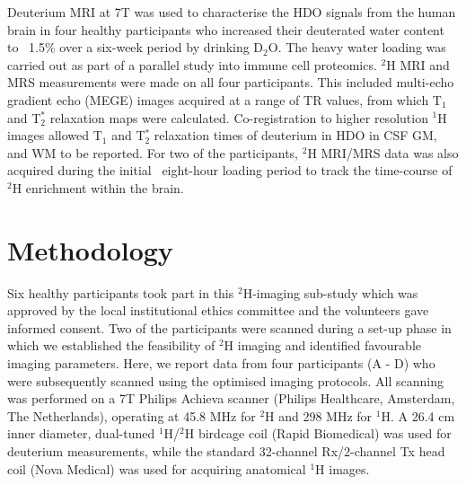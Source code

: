 \documentclass[class=article, crop=false]{standalone}
\begin{document}
Deuterium MRI at 7T was used to characterise the HDO signals from the human brain in four healthy participants who increased their deuterated water content to ~1.5\% over a six-week period by drinking D$_2$O. The heavy water loading was carried out as part of a parallel study into immune cell proteomics. $^2$H MRI and MRS measurements were made on all four participants. This included multi-echo gradient echo (MEGE) images acquired at a range of TR values, from which T$_1$ and T$_2^*$ relaxation maps were calculated. Co-registration to higher resolution $^1$H images allowed T$_1$ and T$_2^*$ relaxation times of deuterium in HDO in CSF GM, and WM to be reported. For two of the participants, $^2$H MRI/MRS data was also acquired during the initial ~eight-hour loading period to track the time-course of $^2$H enrichment within the brain\cite{Cocking2023DeuteriumDosing}. 


\section{Methodology}

Six healthy participants took part in this $^2$H-imaging sub-study which was approved by the local institutional ethics committee and the volunteers gave informed consent. Two of the participants were scanned during a set-up phase in which we established the feasibility of $^2$H imaging and identified favourable imaging parameters. Here, we report data from four participants (A - D) who were subsequently scanned using the optimised imaging protocols. All scanning was performed on a 7T Philips Achieva scanner (Philips Healthcare, Amsterdam, The Netherlands), operating at 45.8 MHz for $^2$H and 298 MHz for $^1$H. A 26.4 cm inner diameter, dual-tuned $^1$H/$^2$H birdcage coil (Rapid Biomedical) was used for deuterium measurements, while the standard 32-channel Rx/2-channel Tx head coil (Nova Medical) was used for acquiring anatomical $^1$H images.  
\end{document}
